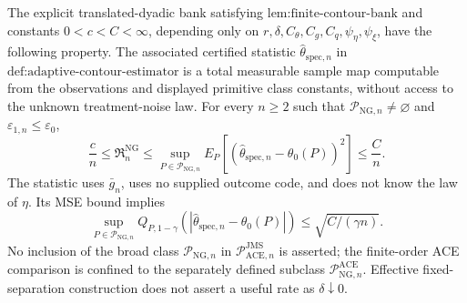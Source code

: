 The explicit translated-dyadic bank satisfying \(\text{lem:finite-contour-bank}\) and constants \(0<c<C<\infty\), depending only on \(r,\delta,C_{\theta},C_g,C_q,\psi_{\eta},\psi_{\xi}\), have the following property.  The associated certified statistic \(\widehat\theta_{\mathrm{spec},n}\) in \(\text{def:adaptive-contour-estimator}\) is a total measurable sample map computable from the observations and displayed primitive class constants, without access to the unknown treatment-noise law.  For every \(n\ge2\) such that \(\mathcal P_{\mathrm{NG},n}\neq\varnothing\) and \(\varepsilon_{1,n}\le\varepsilon_0\),
\[
 \frac cn\le\mathfrak R_n^{\mathrm{NG}}
 \le\sup_{P\in\mathcal P_{\mathrm{NG},n}}
 E_P[(\widehat\theta_{\mathrm{spec},n}-\theta_0(P))^2]
 \le\frac Cn.
\]
The statistic uses \(\bar g_n\), uses no supplied outcome code, and does not know the law of \(\eta\).  Its MSE bound implies
\[
 \sup_{P\in\mathcal P_{\mathrm{NG},n}}
 Q_{P,1-\gamma}(|\widehat\theta_{\mathrm{spec},n}-\theta_0(P)|)
 \le\sqrt{C/(\gamma n)}.
\]
No inclusion of the broad class \(\mathcal P_{\mathrm{NG},n}\) in \(\mathcal P_{\mathrm{ACE},n}^{\mathrm{JMS}}\) is asserted; the finite-order ACE comparison is confined to the separately defined subclass \(\mathcal P_{\mathrm{NG},n}^{\mathrm{ACE}}\).  Effective fixed-separation construction does not assert a useful rate as \(\delta\downarrow0\).